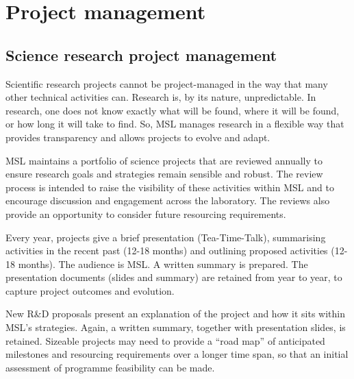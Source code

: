 \section{Project management}
\subsection{Science research project management}
Scientific research projects cannot be project-managed in the way that many other technical activities can. Research is, by its nature, unpredictable.  In research, one does not know exactly what will be found, where it will be found, or how long it will take to find. So, MSL manages research in a flexible way that provides transparency and allows projects to evolve and adapt. 

MSL maintains a portfolio of science projects that are reviewed annually to ensure research goals and strategies remain sensible and robust. The review process is intended to raise the visibility of these activities within MSL and to encourage discussion and engagement across the laboratory. The reviews also provide an opportunity to consider future resourcing requirements. 

Every year, projects give a brief presentation (Tea-Time-Talk), summarising activities in the recent past (12-18 months) and outlining proposed activities (12-18 months). The audience is MSL. A written summary is prepared. The presentation documents (slides and summary) are retained from year to year, to capture project outcomes and evolution. 

New R\&D proposals present an explanation of the project and how it sits within MSL’s strategies. Again, a written summary, together with presentation slides, is retained. Sizeable projects may need to provide a “road map” of anticipated milestones and resourcing requirements over a longer time span, so that an initial assessment of programme feasibility can be made.

